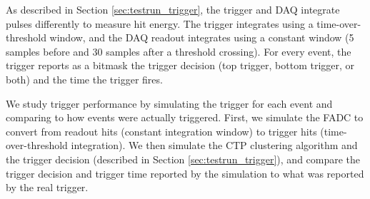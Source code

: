 
As described in Section \ref{sec:testrun_trigger}, the trigger and DAQ integrate pulses differently to measure hit energy. The trigger integrates using a time-over-threshold window, and the DAQ readout integrates using a constant window (5 samples before and 30 samples after a threshold crossing). 
For every event, the trigger reports as a bitmask the trigger decision (top trigger, bottom trigger, or both) and the time the trigger fires.

We study trigger performance by simulating the trigger for each event and comparing to how events were actually triggered.
First, we simulate the FADC to convert from readout hits (constant integration window) to trigger hits (time-over-threshold integration). 
We then simulate the CTP clustering algorithm and the trigger decision (described in Section \ref{sec:testrun_trigger}), and compare the trigger decision and trigger time reported by the simulation to what was reported by the real trigger.

